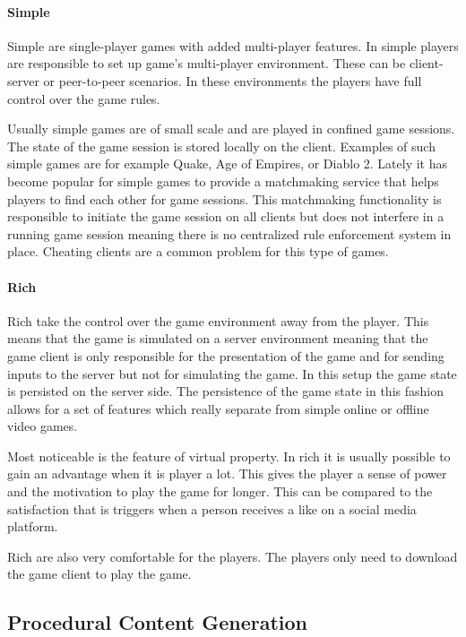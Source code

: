 \paragraph{Simple \ogs{}}

Simple \ogs{} are single-player games with added multi-player features.
In simple \ogs{} players are responsible to set up game's multi-player
environment. These can be client-server or peer-to-peer scenarios. In these
environments the players have full control over the game rules.

Usually simple games are of small scale and are played in confined game
sessions. The state of the game session is stored locally on the client.
Examples of such simple games are for example Quake, Age of Empires, or Diablo
2. Lately it has become popular for simple games to provide a matchmaking
service that helps players to find each other for game sessions. This
matchmaking functionality is responsible to initiate the game session on all
clients but does not interfere in a running game session meaning there is no
centralized rule enforcement system in place. Cheating clients are a common
problem for this type of games.

\paragraph{Rich \ogs{}}

Rich \ogs{} take the control over the game environment away from the player.
This means that the game is simulated on a server environment meaning that the
game client is only responsible for the presentation of the game and for sending
inputs to the server but not for simulating the game. In this setup the game
state is persisted on the server side. The persistence of the game state in this
fashion allows for a set of features which really separate \ogs{} from simple
online or offline video games.

Most noticeable is the feature of virtual property. In rich \ogs{} it is usually
possible to gain an advantage when it is player a lot. This gives the player a
sense of power and the motivation to play the game for longer. This can be
compared to the satisfaction that is triggers when a person receives a like on a
social media platform.

Rich \ogs{} are also very comfortable for the players. The players only need to
download the game client to play the game.

\subsection{Procedural Content Generation}

